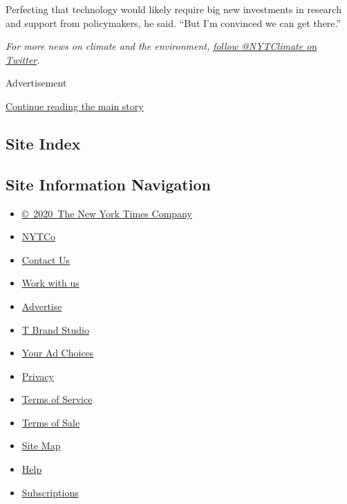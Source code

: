 Perfecting that technology would likely require big new investments in
research and support from policymakers, he said. ``But I'm convinced we
can get there.''

\emph{For more news on climate and the environment,}
\href{https://twitter.com/nytclimate}{\emph{follow @NYTClimate on
Twitter}}\emph{.}

Advertisement

\protect\hyperlink{after-bottom}{Continue reading the main story}

\hypertarget{site-index}{%
\subsection{Site Index}\label{site-index}}

\hypertarget{site-information-navigation}{%
\subsection{Site Information
Navigation}\label{site-information-navigation}}

\begin{itemize}
\tightlist
\item
  \href{https://help.nytimes3xbfgragh.onion/hc/en-us/articles/115014792127-Copyright-notice}{©~2020~The
  New York Times Company}
\end{itemize}

\begin{itemize}
\tightlist
\item
  \href{https://www.nytco.com/}{NYTCo}
\item
  \href{https://help.nytimes3xbfgragh.onion/hc/en-us/articles/115015385887-Contact-Us}{Contact
  Us}
\item
  \href{https://www.nytco.com/careers/}{Work with us}
\item
  \href{https://nytmediakit.com/}{Advertise}
\item
  \href{http://www.tbrandstudio.com/}{T Brand Studio}
\item
  \href{https://www.nytimes3xbfgragh.onion/privacy/cookie-policy\#how-do-i-manage-trackers}{Your
  Ad Choices}
\item
  \href{https://www.nytimes3xbfgragh.onion/privacy}{Privacy}
\item
  \href{https://help.nytimes3xbfgragh.onion/hc/en-us/articles/115014893428-Terms-of-service}{Terms
  of Service}
\item
  \href{https://help.nytimes3xbfgragh.onion/hc/en-us/articles/115014893968-Terms-of-sale}{Terms
  of Sale}
\item
  \href{https://spiderbites.nytimes3xbfgragh.onion}{Site Map}
\item
  \href{https://help.nytimes3xbfgragh.onion/hc/en-us}{Help}
\item
  \href{https://www.nytimes3xbfgragh.onion/subscription?campaignId=37WXW}{Subscriptions}
\end{itemize}
